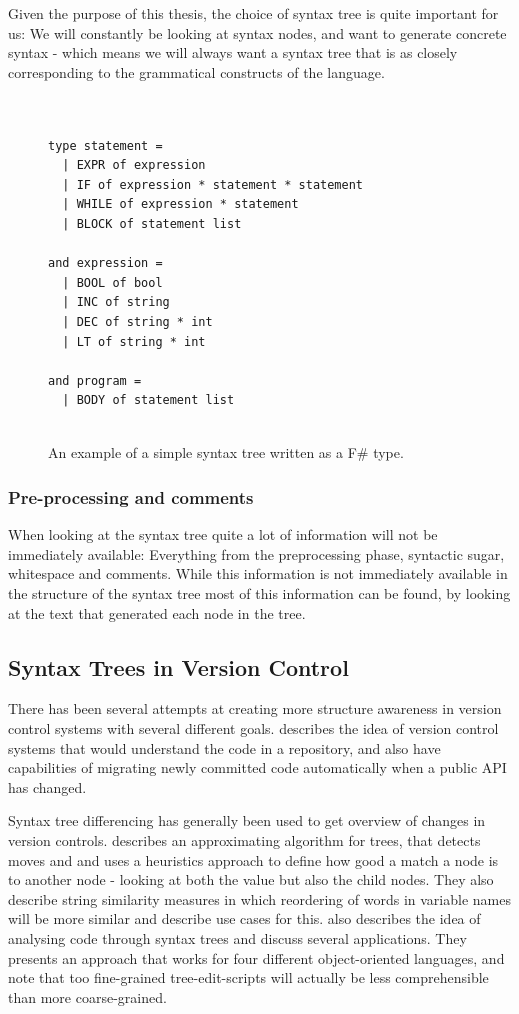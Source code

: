 \documentclass[11pt]{article}
\begin{document}
Given the purpose of this thesis, the choice of syntax tree is quite important for us: We will constantly be looking at syntax nodes, and want to generate concrete syntax - which means we will always want a syntax tree that is as closely corresponding to the grammatical constructs of the language.

\begin{figure}
  \caption{An example of a simple syntax tree written as a F\# type.}
  \label{syntaxtree}
\begin{verbatim}


type statement =
  | EXPR of expression
  | IF of expression * statement * statement
  | WHILE of expression * statement
  | BLOCK of statement list

and expression =
  | BOOL of bool
  | INC of string
  | DEC of string * int
  | LT of string * int

and program = 
  | BODY of statement list


\end{verbatim}
\end{figure}



\subsubsection{Pre-processing and comments}
When looking at the syntax tree quite a lot of information will not be immediately available: Everything from the preprocessing phase, syntactic sugar, whitespace and comments. While this information is not immediately available in the structure of the syntax tree most of this information can be found, by looking at the text that generated each node in the tree. 

\subsection{Syntax Trees in Version Control}
There has been several attempts at creating more structure awareness in version control systems with several different goals. \citet{Freese} describes the idea of version control systems that would understand the code in a repository, and also have capabilities of migrating newly committed code automatically when a public API has changed.

Syntax tree differencing has generally been used to get overview of changes in version controls. \citet{Fluri} describes an approximating algorithm for trees, that  detects moves and and uses a heuristics approach to define how good a match a node is to another node - looking at both the value but also the child nodes. They also describe string similarity measures in which reordering of words in variable names will be more similar and describe use cases for this. \citet{Hashimoto} also describes the idea of analysing code through syntax trees and discuss several applications. They presents an approach that works for four different object-oriented languages, and note that too fine-grained tree-edit-scripts will actually be less comprehensible than more coarse-grained.
\end{document}
